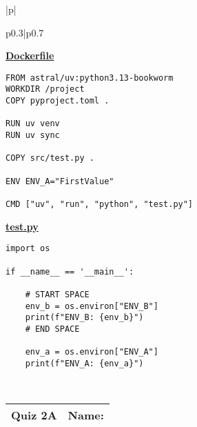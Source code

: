 \documentclass[11pt]{article}
\begin{document}
\begin{table}[h]
\begin{tabular}{|p{\textwidth}|}
\begin{tabular}{p{0.3\textwidth}|p{0.7\textwidth}}
\begin{minipage}[t]{\linewidth}
\underline{\textbf{Dockerfile}}
\begin{verbatim}
FROM astral/uv:python3.13-bookworm
WORKDIR /project
COPY pyproject.toml .

RUN uv venv
RUN uv sync

COPY src/test.py .

ENV ENV_A="FirstValue"

CMD ["uv", "run", "python", "test.py"]
\end{verbatim}

\vspace{10pt}

\underline{\textbf{test.py}}
\begin{verbatim}
import os

if __name__ == '__main__':

    # START SPACE
    env_b = os.environ["ENV_B"]
    print(f"ENV_B: {env_b}")
    # END SPACE

    env_a = os.environ["ENV_A"]
    print(f"ENV_A: {env_a}")

\end{verbatim}

\end{minipage}
\end{tabular} \\
\hline
\end{tabular}
\end{table}

\newpage

\begin{tabularx}{\textwidth}{l|X}
    \textbf{Quiz 2A} &   \textbf{Name: } \\
    \hline 
    \end{tabularx}
\end{document}
